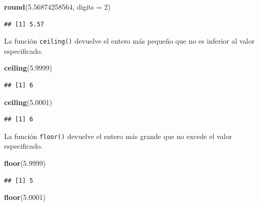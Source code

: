 \documentclass[
]{book}
\newenvironment{Shaded}{\begin{snugshade}}{\end{snugshade}}
\newcommand{\DataTypeTok}[1]{\textcolor[rgb]{0.13,0.29,0.53}{#1}}
\newcommand{\DecValTok}[1]{\textcolor[rgb]{0.00,0.00,0.81}{#1}}
\newcommand{\FloatTok}[1]{\textcolor[rgb]{0.00,0.00,0.81}{#1}}
\newcommand{\KeywordTok}[1]{\textcolor[rgb]{0.13,0.29,0.53}{\textbf{#1}}}
\newcommand{\NormalTok}[1]{#1}
\begin{document}
\begin{Shaded}
\begin{Highlighting}[]
\KeywordTok{round}\NormalTok{(}\FloatTok{5.56874258564}\NormalTok{, }\DataTypeTok{digits =} \DecValTok{2}\NormalTok{)}
\end{Highlighting}
\end{Shaded}

\begin{verbatim}
## [1] 5.57
\end{verbatim}

La función \texttt{ceiling()} devuelve el entero más pequeño que no es inferior al valor especificado.

\begin{Shaded}
\begin{Highlighting}[]
\KeywordTok{ceiling}\NormalTok{(}\FloatTok{5.9999}\NormalTok{)}
\end{Highlighting}
\end{Shaded}

\begin{verbatim}
## [1] 6
\end{verbatim}

\begin{Shaded}
\begin{Highlighting}[]
\KeywordTok{ceiling}\NormalTok{(}\FloatTok{5.0001}\NormalTok{)}
\end{Highlighting}
\end{Shaded}

\begin{verbatim}
## [1] 6
\end{verbatim}

La función \texttt{floor()} devuelve el entero más grande que no excede el valor especificado.

\begin{Shaded}
\begin{Highlighting}[]
\KeywordTok{floor}\NormalTok{(}\FloatTok{5.9999}\NormalTok{)}
\end{Highlighting}
\end{Shaded}

\begin{verbatim}
## [1] 5
\end{verbatim}

\begin{Shaded}
\begin{Highlighting}[]
\KeywordTok{floor}\NormalTok{(}\FloatTok{5.0001}\NormalTok{)}
\end{Highlighting}
\end{Shaded}
\end{document}
